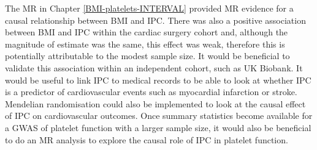\documentclass[11pt,twoside]{bristolthesis}
\begin{document}
The MR in Chapter \ref{BMI-platelets-INTERVAL} provided MR evidence for a causal relationship between BMI and IPC. There was also a positive association between BMI and IPC within the cardiac surgery cohort and, although the magnitude of estimate was the same, this effect was weak, therefore this is potentially attributable to the modest sample size. It would be beneficial to validate this association within an independent cohort, such as UK Biobank. It would be useful to link IPC to medical records to be able to look at whether IPC is a predictor of cardiovascular events such as myocardial infarction or stroke. Mendelian randomisation could also be implemented to look at the causal effect of IPC on cardiovascular outcomes. Once summary statistics become available for a GWAS of platelet function with a larger sample size, it would also be beneficial to do an MR analysis to explore the causal role of IPC in platelet function.
\end{document}

